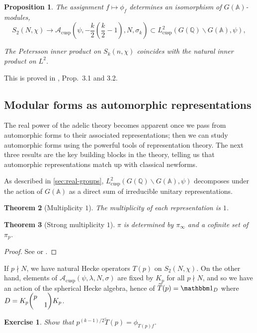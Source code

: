 \documentclass[11pt]{report}
\let\mbb\mathbb
\let\mc\mathcal
\newcommand{\1}{\mathbbm 1}
\newcommand{\Q}{\mathbb{Q}}
\newcommand{\A}{\mbb A}
\renewcommand{\tilde}{\widetilde}
\DeclareMathOperator{\cusp}{cusp}
\theoremstyle{plain}
\newtheorem{thm}{Theorem}[section]
\newcounter{ex}
\newtheorem{exercise}[ex]{Exercise}
\newtheorem{prop}[thm]{Proposition}
\theoremstyle{definition}
\theoremstyle{remark}
\numberwithin{equation}{section}
\begin{document}
\begin{prop}
  The assignment $f \mapsto \phi_{f}$ determines an isomorphism of $G(\A)$-modules,
  \begin{equation}
    \label{eq:20}
S_{2}(N,\chi) \to \mc A_{\cusp}(\psi,-\frac{k}{2}(\frac{k}{2}-1),N,\sigma_{k}) \subset
L^{2}_{\cusp}(G(\Q)\backslash G(\A),\psi),
\end{equation}

The Petersson inner product on $S_{k}(n,\chi)$ coincides with the natural
inner product on $L^{2}$.
\end{prop}
This is proved in \cite{gelbart1973}, Prop.~3.1 and 3.2.

\subsection{Modular forms as automorphic representations}
\label{sec:modular-forms-as}
The real power of the adelic theory becomes apparent once we pass from
automorphic forms to their associated representations; then we can
study automorphic forms using the powerful tools of representation
theory. The next three results are the key building blocks in the
theory, telling us that automorphic representations match up with
classical newforms.

As described in \cref{sec:real-groups},
$L^{2}_{\cusp}(G(\Q)\backslash G(\A),\psi)$ decomposes under the action of
$G(\A)$ as a direct sum of irreducible unitary representations.

\begin{thm}[Multiplicity $1$]
  The multiplicity of each representation is $1$.
\end{thm}

\begin{thm}[Strong multiplicity $1$]
  $\pi$ is determined by $\pi_{\infty}$ and a cofinite set of $\pi_{p}$.
\end{thm}
\begin{proof}
  See \cite[Prop.~5.14]{gelbart1973} or \cite{casselman1973}.
\end{proof}

If $p \nmid N$, we have natural Hecke operators $T(p)$ on
$S_{2}(N,\chi)$. On the other hand, elements of
$\mc A_{\cusp}(\psi,\lambda,N,\sigma)$ are fixed by $K_{p}$ for all
$p \nmid N$, and so we have an action of the spherical Hecke algebra,
hence of $\tilde T(p) = \1_{D}$ where
$D = K_{p}\mqty(p & \\ & 1)K_{p}$.

\begin{exercise}
Show that $p^{(k-1)/2}\tilde T(p) = \phi_{T(p)f}$.
\end{exercise}
\end{document}
